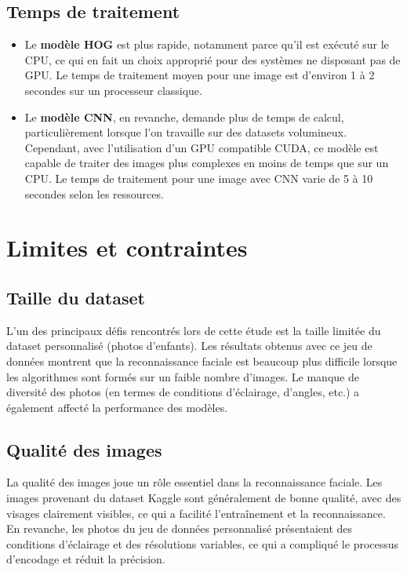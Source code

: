 \documentclass[a4paper,12pt]{report}
\begin{document}
\subsection{Temps de traitement}
\begin{itemize}
    \item Le \textbf{modèle HOG} est plus rapide, notamment parce qu’il est exécuté sur le CPU, ce qui en fait un choix approprié pour des systèmes ne disposant pas de GPU. Le temps de traitement moyen pour une image est d'environ 1 à 2 secondes sur un processeur classique.
    \item Le \textbf{modèle CNN}, en revanche, demande plus de temps de calcul, particulièrement lorsque l'on travaille sur des datasets volumineux. Cependant, avec l’utilisation d’un GPU compatible CUDA, ce modèle est capable de traiter des images plus complexes en moins de temps que sur un CPU. Le temps de traitement pour une image avec CNN varie de 5 à 10 secondes selon les ressources.
\end{itemize}


\section{Limites et contraintes}
\subsection{Taille du dataset}
L'un des principaux défis rencontrés lors de cette étude est la taille limitée du dataset personnalisé (photos d'enfants). Les résultats obtenus avec ce jeu de données montrent que la reconnaissance faciale est beaucoup plus difficile lorsque les algorithmes sont formés sur un faible nombre d'images. Le manque de diversité des photos (en termes de conditions d'éclairage, d'angles, etc.) a également affecté la performance des modèles.

\subsection{Qualité des images}
La qualité des images joue un rôle essentiel dans la reconnaissance faciale. Les images provenant du dataset Kaggle sont généralement de bonne qualité, avec des visages clairement visibles, ce qui a facilité l’entraînement et la reconnaissance. En revanche, les photos du jeu de données personnalisé présentaient des conditions d’éclairage et des résolutions variables, ce qui a compliqué le processus d’encodage et réduit la précision.
\end{document}
